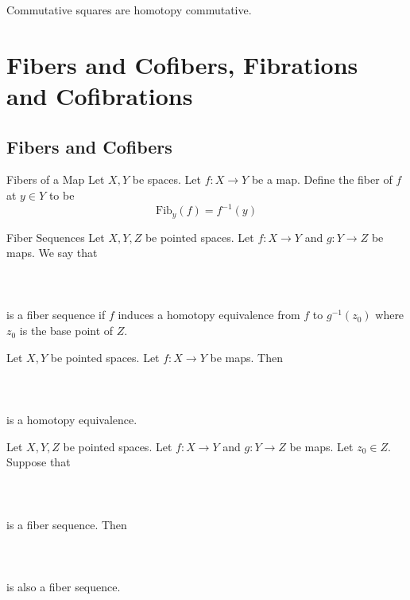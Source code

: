 \documentclass[a4paper]{article}
\begin{document}
Commutative squares are homotopy commutative. 

\pagebreak
\section{Fibers and Cofibers, Fibrations and Cofibrations}
\subsection{Fibers and Cofibers}
\begin{defn}{Fibers of a Map}{} Let $X,Y$ be spaces. Let $f:X\to Y$ be a map. Define the fiber of $f$ at $y\in Y$ to be $$\text{Fib}_y(f)=f^{-1}(y)$$
\end{defn}
\begin{defn}{Fiber Sequences}{} Let $X,Y,Z$ be pointed spaces. Let $f:X\to Y$ and $g:Y\to Z$ be maps. We say that \\~\\
\\~\\
is a fiber sequence if $f$ induces a homotopy equivalence from $f$ to $g^{-1}(z_0)$ where $z_0$ is the base point of $Z$. 
\end{defn}

\begin{prp}{}{} Let $X,Y$ be pointed spaces. Let $f:X\to Y$ be maps. Then \\~\\
\\~\\
is a homotopy equivalence. 
\end{prp}

\begin{prp}{}{} Let $X,Y,Z$ be pointed spaces. Let $f:X\to Y$ and $g:Y\to Z$ be maps. Let $z_0\in Z$. Suppose that \\~\\
\\~\\
is a fiber sequence. Then \\~\\
\\~\\
is also a fiber sequence. 
\end{prp}
\end{document}
